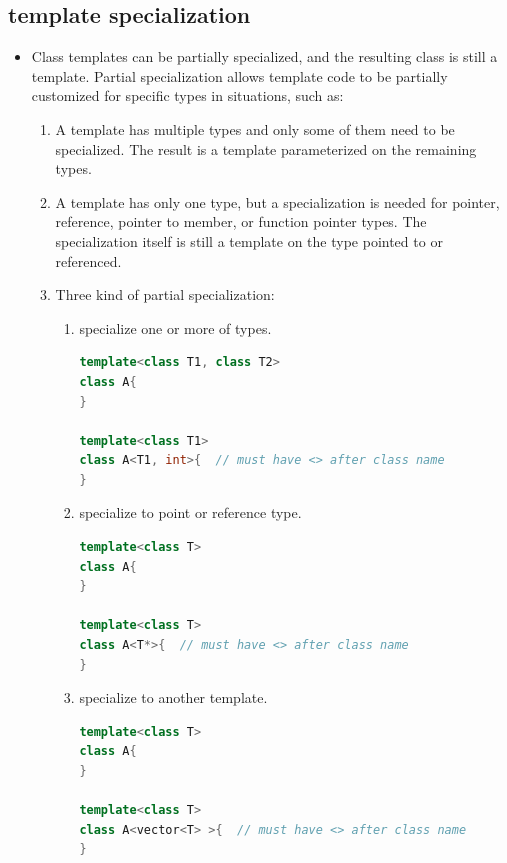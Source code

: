 \documentclass[a4paper,11pt,twoside]{book}
\begin{document}
\subsection{template specialization}
\begin{itemize}
	\item Class templates can be partially specialized, and the resulting class is still a template. Partial specialization allows template code to be partially customized for specific types in situations, such as:

	\begin{enumerate}
		\item A template has multiple types and only some of them need to be specialized. The result is a template parameterized on the remaining types.

		\item A template has only one type, but a specialization is needed for pointer, reference, pointer to member, or function pointer types. The specialization itself is still a template on the type pointed to or referenced.
		
		\item Three kind of partial specialization:
		\begin{enumerate}
			\item specialize one or more of types.
\begin{lstlisting}[frame=single, language=c++]
template<class T1, class T2>
class A{
}

template<class T1>
class A<T1, int>{  // must have <> after class name
}		
\end{lstlisting}				
			
			\item specialize to point or reference type.
\begin{lstlisting}[frame=single, language=c++]
template<class T>
class A{
}

template<class T>
class A<T*>{  // must have <> after class name
}		
\end{lstlisting}	
			\item specialize to another template.
\begin{lstlisting}[frame=single, language=c++]
template<class T>
class A{
}

template<class T>
class A<vector<T> >{  // must have <> after class name
}			
\end{lstlisting}	

		\end{enumerate}
	

\end{enumerate}
\end{itemize}
\end{document}
